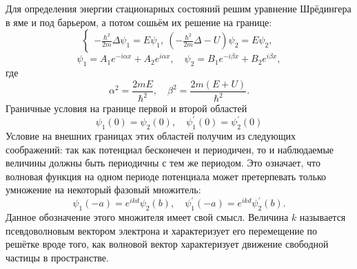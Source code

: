 \documentclass{ncc}
\begin{document}
Для определения энергии стационарных состояний решим уравнение Шрёдингера в яме и под барьером, а потом сошьём их решение на границе:
\[
  \begin{cases}
    -\frac{\hbar^2}{2m}\Delta \psi_1 = E\psi_1,\
    \left(-\frac{\hbar^2}{2m}\Delta - U\right) \psi_2 = E\psi_2,
  \end{cases}
\]
\[
    \psi_1 = A_1 e^{-i\alpha x} + A_2 e^{i\alpha x},\quad
    \psi_2 = B_1 e^{-i\beta x} + B_2 e^{i\beta x},
\]
где
\[
  \alpha^2 = \frac{2mE}{\hbar^2}, \quad \beta^2 = \frac{2m(E+U)}{\hbar^2}.
\]
Граничные условия на границе первой и второй областей
\[
    \psi_1(0) = \psi_2(0),\quad
    \psi_1^\prime(0) = \psi_2^\prime(0)
\]
Условие на внешних границах этих областей получим из следующих соображений: так как потенциал бесконечен и периодичен, то и наблюдаемые величины должны быть периодичны с тем же периодом. Это означает, что волновая функция на одном периоде потенциала может претерпевать только умножение на некоторый фазовый множитель:
\[
    \psi_1(-a) = e^{ikd}\psi_2(b),\quad
    \psi_1^\prime(-a) = e^{ikd}\psi_2^\prime(b).
\]
Данное обозначение этого множителя имеет свой смысл. Величина \( k \)
называется псевдоволновым вектором электрона и характеризует его перемещение по
решётке вроде того, как волновой вектор характеризует движение свободной частицы
в пространстве.
\end{document}
